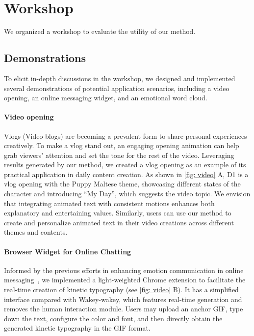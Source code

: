 \section{Workshop}
\label{sec:workshop}
We organized a workshop to evaluate the utility of our method.

\subsection{Demonstrations}
To elicit in-depth discussions in the workshop, we designed and implemented several demonstrations of potential application scenarios, including a video opening, an online messaging widget, and an emotional word cloud.

\paragraph{Video opening}

Vlogs (Video blogs) are becoming a prevalent form to share personal experiences creatively.
To make a vlog stand out, an engaging opening animation can help grab viewers' attention and set the tone for the rest of the video.
Leveraging results generated by our method, we created a vlog opening as an example of its practical application in daily content creation.
As shown in \autoref{fig: video} A, D1 is a vlog opening with the Puppy Maltese theme, showcasing different states of the character and introducing ``My Day'', which suggests the video topic. 
We envision that integrating animated text with consistent motions enhances both explanatory and entertaining values. 
Similarly, users can use our method to create and personalize animated text in their video creations across different themes and contents.

\paragraph{Browser Widget for Online Chatting}
Informed by the previous efforts in enhancing emotion communication in online messaging~\cite{Wang2004communicate, malik2009communicating, aoki2022emoballon}, we implemented a light-weighted Chrome extension to facilitate the real-time creation of kinetic typography (see \autoref{fig: video} B).
It has a simplified interface compared with Wakey-wakey, which features real-time generation and removes the human interaction module.
Users may upload an anchor GIF, type down the text, configure the color and font, and then directly obtain the generated kinetic typography in the GIF format.


